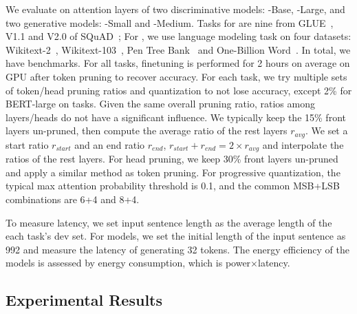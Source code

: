 We evaluate \name on attention layers of two discriminative models: \bert-Base, \bert-Large, and two generative models: \gpttwo-Small and \gpttwo-Medium. Tasks for \bert are nine from  GLUE~\cite{wang-etal-2018-glue}, V1.1 and V2.0 of SQuAD~\cite{rajpurkar2016squad}; For \gpttwo, we use language modeling task on four datasets: Wikitext-2~\cite{merity2016pointer}, Wikitext-103~\cite{merity2016pointer}, Pen Tree Bank~\cite{marcus-etal-1993-building} and One-Billion Word~\cite{chelba2013one}. In total, we have \numbenchmark benchmarks. 
For all tasks, finetuning is performed for 2 hours on average on GPU after token pruning to recover accuracy.
For each task, we try multiple sets of token/head pruning ratios and quantization \bitwidths to not lose accuracy, except 2\% for BERT-large on \squad tasks. Given the same overall pruning ratio, ratios among layers/heads do not have a significant influence. We typically keep the 15\% front layers un-pruned, then compute the average ratio of the rest layers $r_{avg}$. We set a start ratio $r_{start}$ and an end ratio $r_{end}$, $r_{start} + r_{end} = 2
\times r_{avg}$ and interpolate the ratios of the rest layers. For head pruning, we keep 30\% front layers un-pruned and apply a similar method as token pruning. For progressive quantization, the typical max attention probability threshold is 0.1, and the common MSB+LSB combinations are 6+4 and 8+4.


To measure \bert latency, we set input sentence length as the average length of the each task's dev set. For \gpttwo models, we set the initial length of the input sentence as 992 and measure the latency of generating 32 tokens. The energy efficiency of the models is assessed by energy consumption, which is power$\times$latency.


\subsection{Experimental Results}



